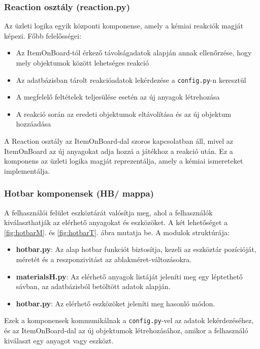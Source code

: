 \documentclass[]{thesis-ekf}
\begin{document}
	\subsubsection{Reaction osztály (reaction.py)}
	
	Az üzleti logika egyik központi komponense, amely a kémiai reakciók magját képezi. Főbb felelősségei:
	\begin{itemize}
		\item Az ItemOnBoard-tól érkező távolságadatok alapján annak ellenőrzése, hogy mely objektumok között lehetséges reakció
		\item Az adatbázisban tárolt reakcióadatok lekérdezése a \texttt{config.py}-n keresztül
		\item A megfelelő feltételek teljesülése esetén az új anyagok létrehozása
		\item A reakció során az eredeti objektumok eltávolítása és az új objektum hozzáadása
	\end{itemize}
	A Reaction osztály az ItemOnBoard-dal szoros kapcsolatban áll, mivel az ItemOnBoard az új anyagokat adja hozzá a játékhoz a reakció után. Ez a komponens az üzleti logika magját reprezentálja, amely a kémiai ismereteket implementálja.
	
	\subsubsection{Hotbar komponensek (HB/ mappa)}
	
	A felhasználói felület eszköztárát valósítja meg, ahol a felhasználók kiválaszthatják az elérhető anyagokat és eszközöket. A két lehetőséget a \ref{fig:hotbarM}. és \ref{fig:hotbarT}. ábra mutatja be. A modulok struktúrája:
	\begin{itemize}
		\item \textbf{hotbar.py}: Az alap hotbar funkciót biztosítja, kezeli az eszköztár pozícióját, méretét és a reszponzivitást az ablakméret-változásokra.
		\item \textbf{materialsH.py}: Az elérhető anyagok listáját jeleníti meg egy léptethető sávban, az adatbázisból betöltött adatok alapján.
		\item \textbf{hotbar.py}: Az elérhető eszközöket jeleníti meg hasonló módon.
	\end{itemize}
	Ezek a komponensek kommunikálnak a \texttt{config.py}-vel az adatok lekérdezéséhez, és az ItemOnBoard-dal az új objektumok létrehozásához, amikor a felhasználó kiválaszt egy anyagot vagy eszközt.\\
	
\end{document}
